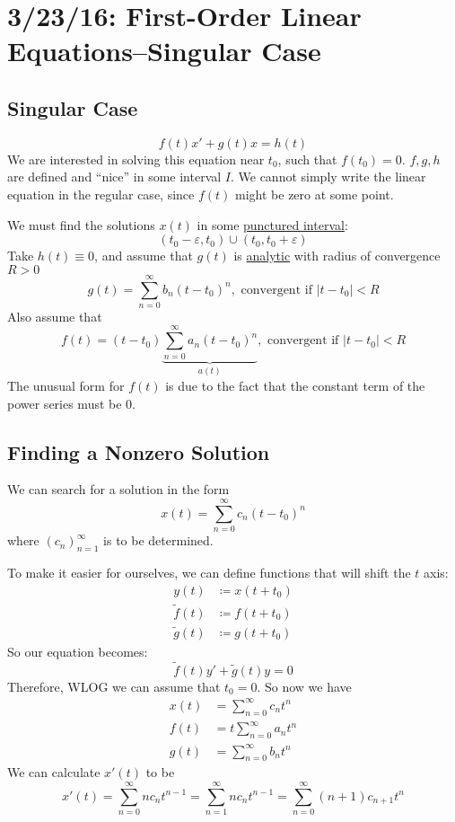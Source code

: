 \documentclass[12pt]{article}
\begin{document}
\section{3/23/16: First-Order Linear Equations--Singular Case}

\subsection{Singular Case}
\[ f(t)x' + g(t)x = h(t) \]
We are interested in solving this equation near $t_0$, such that $f(t_0) = 0$. $f,g,h$ are defined and ``nice'' in some interval $I$. We cannot simply write the linear equation in the regular case, since $f(t)$ might be zero at some point. 

We must find the solutions $x(t)$ in some \underline{punctured interval}:
\[ (t_0 - \varepsilon, t_0) \cup (t_0, t_0 + \varepsilon) \]
Take $h(t) \equiv 0$, and assume that $g(t)$ is \underline{analytic} with radius of convergence $R > 0$ 
\[ g(t) = \sum_{n=0}^{\infty} b_n(t-t_0)^n, \text{ convergent if } |t-t_0| < R \]
Also assume that \[ f(t) = (t-t_0)\underbrace{\sum_{n=0}^{\infty}a_n(t-t_0)^n}_{a(t)}, \text{ convergent if } |t-t_0| < R \]
The unusual form for $f(t)$ is due to the fact that the constant term of the power series must be 0.

\subsection{Finding a Nonzero Solution}
We can search for a solution in the form \[ x(t) = \sum_{n=0}^{\infty} c_n(t-t_0)^n \] where $(c_n)_{n=1}^{\infty}$ is to be determined.

To make it easier for ourselves, we can define functions that will shift the $t$ axis:
\[
\begin{aligned}
y(t) &\coloneqq x(t+t_0) \\
\tilde{f}(t) &\coloneqq f(t+t_0) \\
\tilde{g}(t) &\coloneqq g(t+t_0)
\end{aligned}
\]
So our equation becomes:
\[ \tilde{f}(t)y' + \tilde{g}(t)y = 0 \]
Therefore, WLOG we can assume that $t_0 = 0$. So now we have \[ 
\begin{aligned}
x(t) &= \sum_{n=0}^{\infty} c_nt^n \\
f(t) &= t\sum_{n=0}^{\infty} a_nt^n \\
g(t) &= \sum_{n=0}^{\infty} b_nt^n
\end{aligned}
\]
We can calculate $x'(t)$ to be \[ x'(t) = \sum_{n=0}^{\infty}nc_nt^{n-1} = \sum_{n=1}^{\infty}nc_nt^{n-1} = \sum_{n=0}^{\infty}(n+1)c_{n+1}t^n \]
\end{document}
